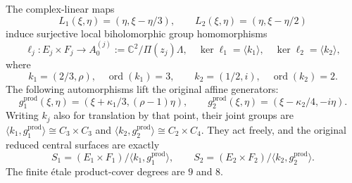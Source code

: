 \begin{theorem}
\label{ffcert:thm:product-covers}
The complex-linear maps
\[
 L_1(\xi,\eta)=(\eta,\xi-\eta/3),\qquad
 L_2(\xi,\eta)=(\eta,\xi-\eta/2)
 \tag{FF12}\label{ffcert:eq:addition-maps}
\]
induce surjective local biholomorphic group homomorphisms
\[
 \ell_j:E_j\times F_j\longrightarrow
 A_0^{(j)}:=\mathbb C^2/\Pi(z_j)\Lambda,
 \quad \ker\ell_1=\langle k_1\rangle,
 \quad \ker\ell_2=\langle k_2\rangle,
 \tag{FF13}\label{ffcert:eq:torus-covers}
\]
where
\[
 k_1=(2/3,\rho),\quad \operatorname{ord}(k_1)=3,
 \qquad k_2=(1/2,i),\quad \operatorname{ord}(k_2)=2.
 \tag{FF14}\label{ffcert:eq:kernel-points}
\]
The following automorphisms lift the original affine generators:
\[
 g^{\mathrm{prod}}_1(\xi,\eta)
   =(\xi+\kappa_1/3,(\rho-1)\eta),\qquad
 g^{\mathrm{prod}}_2(\xi,\eta)
   =(\xi-\kappa_2/4,-i\eta).
 \tag{FF15}\label{ffcert:eq:product-generators}
\]
Writing $k_j$ also for translation by that point, their joint groups
are $\langle k_1,g^{\mathrm{prod}}_1\rangle\cong C_3\times C_3$
and $\langle k_2,g^{\mathrm{prod}}_2\rangle\cong C_2\times C_4$.
They act freely, and the original reduced central surfaces are exactly
\[
 S_1=(E_1\times F_1)/\langle k_1,g^{\mathrm{prod}}_1\rangle,
 \qquad
 S_2=(E_2\times F_2)/\langle k_2,g^{\mathrm{prod}}_2\rangle.
 \tag{FF16}\label{ffcert:eq:surface-product-covers}
\]
The finite \'etale product-cover degrees are $9$ and $8$.
\end{theorem}

